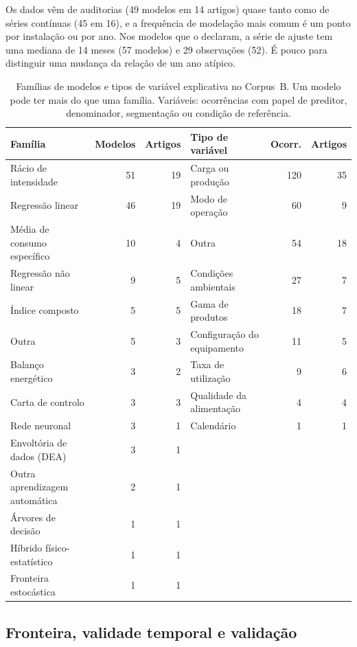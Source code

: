 Os dados vêm de auditorias (49 modelos em 14 artigos) quase tanto como de
séries contínuas (45 em 16), e a frequência de modelação mais comum é um
ponto por instalação ou por ano. Nos modelos que o declaram, a série de
ajuste tem uma mediana de 14 meses (57 modelos) e 29 observações (52).
É pouco para distinguir uma mudança da relação de um ano atípico.

\begin{table}[htbp]
  \centering
  \footnotesize
  \caption[Modelos e variáveis explicativas no Corpus B]{Famílias de modelos
  e tipos de variável explicativa no Corpus~B. Um modelo pode ter mais do que
  uma família. Variáveis: ocorrências com papel de preditor, denominador,
  segmentação ou condição de referência.}
  \label{tab:b-modelos}
  \begin{tabular}{lrr@{\hspace{2.5em}}lrr}
    \toprule
    Família & Modelos & Artigos & Tipo de variável & Ocorr. & Artigos \\
    \midrule
    Rácio de intensidade & 51 & 19 & Carga ou produção & 120 & 35 \\
    Regressão linear & 46 & 19 & Modo de operação & 60 & 9 \\
    Média de consumo específico & 10 & 4 & Outra & 54 & 18 \\
    Regressão não linear & 9 & 5 & Condições ambientais & 27 & 7 \\
    Índice composto & 5 & 5 & Gama de produtos & 18 & 7 \\
    Outra & 5 & 3 & Configuração do equipamento & 11 & 5 \\
    Balanço energético & 3 & 2 & Taxa de utilização & 9 & 6 \\
    Carta de controlo & 3 & 3 & Qualidade da alimentação & 4 & 4 \\
    Rede neuronal & 3 & 1 & Calendário & 1 & 1 \\
    Envoltória de dados (DEA) & 3 & 1 & & & \\
    Outra aprendizagem automática & 2 & 1 & & & \\
    Árvores de decisão & 1 & 1 & & & \\
    Híbrido físico-estatístico & 1 & 1 & & & \\
    Fronteira estocástica & 1 & 1 & & & \\
    \bottomrule
  \end{tabular}
\end{table}

\subsection{Fronteira, validade temporal e validação}
\label{sec:b-fronteira-validade}


